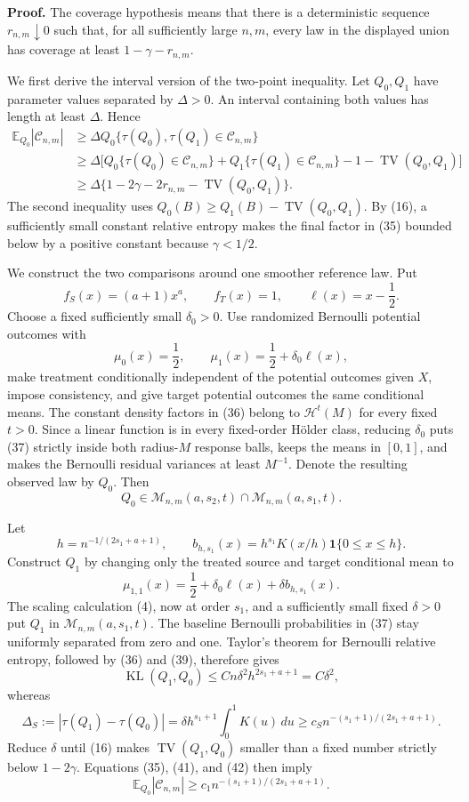 \textbf{Proof.}
The coverage hypothesis means that there is a deterministic sequence \(r_{n,m}\downarrow0\) such that, for all sufficiently large \(n,m\), every law in the displayed union has coverage at least \(1-\gamma-r_{n,m}\).

We first derive the interval version of the two-point inequality.  Let \(Q_0,Q_1\) have parameter values separated by \(\Delta>0\).  An interval containing both values has length at least \(\Delta\).  Hence
\[
\begin{aligned}
\mathbb E_{Q_0}|\mathcal C_{n,m}|
&\ge\Delta Q_0\{\tau(Q_0),\tau(Q_1)\in\mathcal C_{n,m}\}\\
&\ge\Delta\bigl[Q_0\{\tau(Q_0)\in\mathcal C_{n,m}\}
+Q_1\{\tau(Q_1)\in\mathcal C_{n,m}\}
-1-\operatorname{TV}(Q_0,Q_1)\bigr]\\
&\ge\Delta\{1-2\gamma-2r_{n,m}-\operatorname{TV}(Q_0,Q_1)\}.
\end{aligned}
\tag{35}
\]
The second inequality uses \(Q_0(B)\ge Q_1(B)-\operatorname{TV}(Q_0,Q_1)\).  By (16), a sufficiently small constant relative entropy makes the final factor in (35) bounded below by a positive constant because \(\gamma<1/2\).

We construct the two comparisons around one smoother reference law.  Put
\[
f_S(x)=(a+1)x^a,
\qquad
f_T(x)=1,
\qquad
\ell(x)=x-\frac12.
\tag{36}
\]
Choose a fixed sufficiently small \(\delta_0>0\).  Use randomized Bernoulli potential outcomes with
\[
\mu_0(x)=\frac12,
\qquad
\mu_1(x)=\frac12+\delta_0\ell(x),
\tag{37}
\]
make treatment conditionally independent of the potential outcomes given \(X\), impose consistency, and give target potential outcomes the same conditional means.  The constant density factors in (36) belong to \(\mathcal H^t(M)\) for every fixed \(t>0\).  Since a linear function is in every fixed-order H\"older class, reducing \(\delta_0\) puts (37) strictly inside both radius-\(M\) response balls, keeps the means in \([0,1]\), and makes the Bernoulli residual variances at least \(M^{-1}\).  Denote the resulting observed law by \(Q_0\).  Then
\[
Q_0\in\mathcal M_{n,m}(a,s_2,t)
\cap\mathcal M_{n,m}(a,s_1,t).
\tag{38}
\]

Let
\[
h=n^{-1/(2s_1+a+1)},
\qquad
b_{h,s_1}(x)=h^{s_1}K(x/h)\mathbf 1\{0\le x\le h\}.
\tag{39}
\]
Construct \(Q_1\) by changing only the treated source and target conditional mean to
\[
\mu_{1,1}(x)=\frac12+\delta_0\ell(x)+\delta b_{h,s_1}(x).
\tag{40}
\]
The scaling calculation (4), now at order \(s_1\), and a sufficiently small fixed \(\delta>0\) put \(Q_1\) in \(\mathcal M_{n,m}(a,s_1,t)\).  The baseline Bernoulli probabilities in (37) stay uniformly separated from zero and one.  Taylor's theorem for Bernoulli relative entropy, followed by (36) and (39), therefore gives
\[
\operatorname{KL}(Q_1,Q_0)
\le Cn\delta^2h^{2s_1+a+1}
=C\delta^2,
\tag{41}
\]
whereas
\[
\Delta_S:=|\tau(Q_1)-\tau(Q_0)|
=\delta h^{s_1+1}\int_0^1K(u)\,du
\ge c_Sn^{-(s_1+1)/(2s_1+a+1)}.
\tag{42}
\]
Reduce \(\delta\) until (16) makes \(\operatorname{TV}(Q_1,Q_0)\) smaller than a fixed number strictly below \(1-2\gamma\).  Equations (35), (41), and (42) then imply
\[
\mathbb E_{Q_0}|\mathcal C_{n,m}|
\ge c_1n^{-(s_1+1)/(2s_1+a+1)}.
\tag{43}
\]

